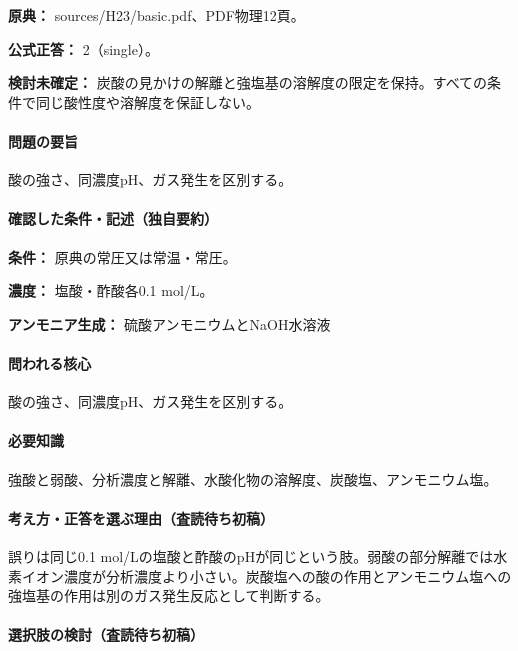 \noindent\textbf{原典：} sources/H23/basic.pdf、PDF物理12頁。

\textbf{公式正答：} 2（single）。

\par\textbf{検討未確定：} 炭酸の見かけの解離と強塩基の溶解度の限定を保持。すべての条件で同じ酸性度や溶解度を保証しない。

\paragraph{問題の要旨} 酸の強さ、同濃度pH、ガス発生を区別する。

\paragraph{確認した条件・記述（独自要約）}\mbox{}\par

\noindent\textbf{条件：} 原典の常圧又は常温・常圧。\par

\noindent\textbf{濃度：} 塩酸・酢酸各0.1 mol/L。\par

\noindent\textbf{アンモニア生成：} 硫酸アンモニウムとNaOH水溶液\par

\paragraph{問われる核心} 酸の強さ、同濃度pH、ガス発生を区別する。

\paragraph{必要知識} 強酸と弱酸、分析濃度と解離、水酸化物の溶解度、炭酸塩、アンモニウム塩。

\paragraph{考え方・正答を選ぶ理由（査読待ち初稿）} 誤りは同じ0.1 mol/Lの塩酸と酢酸のpHが同じという肢。弱酸の部分解離では水素イオン濃度が分析濃度より小さい。炭酸塩への酸の作用とアンモニウム塩への強塩基の作用は別のガス発生反応として判断する。

\paragraph{選択肢の検討（査読待ち初稿）}\mbox{}\par

